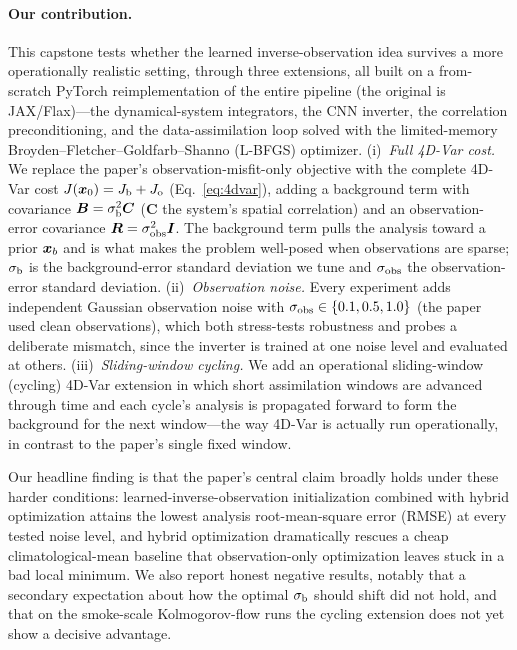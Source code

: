 \paragraph{Our contribution.}
This capstone tests whether the learned inverse-observation idea survives a more
operationally realistic setting, through three extensions, all built on a from-scratch
PyTorch reimplementation of the entire pipeline (the original is JAX/Flax)---the
dynamical-system integrators, the CNN inverter, the correlation preconditioning, and the
data-assimilation loop solved with the limited-memory
Broyden--Fletcher--Goldfarb--Shanno (L-BFGS) optimizer. (i)~\emph{Full 4D-Var cost.}
We replace the paper's observation-misfit-only objective with the complete 4D-Var cost
$J(\bm{x}_0) = J_{\mathrm{b}} + J_{\mathrm{o}}$ (Eq.~\eqref{eq:4dvar}), adding a background term with
covariance $\bm{B} = \sigma_{\mathrm{b}}^2 \bm{C}$ ($\bm{C}$ the system's spatial correlation) and an
observation-error covariance $\bm{R} = \sigma_{\mathrm{obs}}^2 \bm{I}$. The background term pulls the
analysis toward a prior $\bm{x}_b$ and is what makes the problem well-posed when
observations are sparse; $\sigma_{\mathrm{b}}$ is the background-error standard deviation we tune and
$\sigma_{\mathrm{obs}}$ the observation-error standard deviation.
(ii)~\emph{Observation noise.} Every experiment adds independent Gaussian observation
noise with $\sigma_{\mathrm{obs}} \in \{0.1, 0.5, 1.0\}$ (the paper used clean observations), which
both stress-tests robustness and probes a deliberate mismatch, since the inverter is
trained at one noise level and evaluated at others. (iii)~\emph{Sliding-window cycling.}
We add an operational sliding-window (cycling) 4D-Var extension in which short
assimilation windows are advanced through time and each cycle's analysis is propagated
forward to form the background for the next window---the way 4D-Var is actually run
operationally, in contrast to the paper's single fixed window.

Our headline finding is that the paper's central claim broadly holds under these harder
conditions: learned-inverse-observation initialization combined with hybrid optimization
attains the lowest analysis root-mean-square error (RMSE) at every tested noise level,
and hybrid optimization dramatically rescues a cheap climatological-mean baseline that
observation-only optimization leaves stuck in a bad local minimum. We also report honest
negative results, notably that a secondary expectation about how the optimal $\sigma_{\mathrm{b}}$
should shift did not hold, and that on the smoke-scale Kolmogorov-flow runs the cycling
extension does not yet show a decisive advantage.

